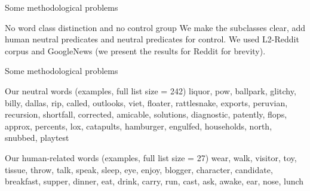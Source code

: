 \documentclass[
  10pt,
  ignorenonframetext,
  x11names, dvipsnames, bibspacing,natbib, table]{beamer}
\begin{document}
\begin{frame}{Some methodological problems}
\protect\hypertarget{some-methodological-problems-1}{}
\begin{block}{No word class distinction and no control group}
\protect\hypertarget{no-word-class-distinction-and-no-control-group}{}
We make the subclasses clear, add human neutral predicates and neutral
predicates for control. We used L2-Reddit corpus and GoogleNews
\linebreak \footnotesize (we present the results for Reddit for
brevity). \normalsize

\footnotesize 
\begin{table}

\caption{\label{tab:religionTableHeadLate}Rows from extended religion dataset.}
\centering
{}
\end{table}
\normalsize
\end{block}
\end{frame}

\begin{frame}{Some methodological problems}
\protect\hypertarget{some-methodological-problems-2}{}
\begin{block}{Our neutral words (examples, full list size = 242)}
\protect\hypertarget{our-neutral-words-examples-full-list-size-242}{}
liquor, pow, ballpark, glitchy, billy, dallas, rip, called, outlooks,
viet, floater, rattlesnake, exports, peruvian, recursion, shortfall,
corrected, amicable, solutions, diagnostic, patently, flops, approx,
percents, lox, catapults, hamburger, engulfed, households, north,
snubbed, playtest
\end{block}

\begin{block}{Our human-related words (examples, full list size = 27)}
\protect\hypertarget{our-human-related-words-examples-full-list-size-27}{}
wear, walk, visitor, toy, tissue, throw, talk, speak, sleep, eye, enjoy,
blogger, character, candidate, breakfast, supper, dinner, eat, drink,
carry, run, cast, ask, awake, ear, nose, lunch
\end{block}
\end{frame}
\end{document}
